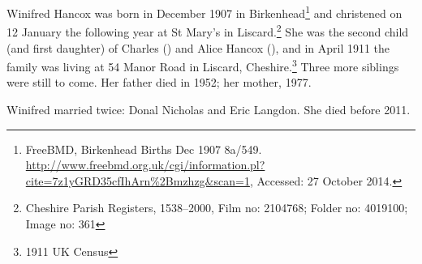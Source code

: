 
Winifred Hancox was born in December 1907 in Birkenhead\footnote{FreeBMD, Birkenhead Births Dec 1907 8a/549. \url{http://www.freebmd.org.uk/cgi/information.pl?cite=7z1yGRD35cfIhArn\%2Bmzhzg&scan=1}, Accessed: 27 October 2014.} and christened on 12 January the following year at St Mary's in Liscard.\footnote{Cheshire Parish Registers, 1538--2000, Film no: 2104768; Folder no: 4019100; Image no: 361} She was the second child (and first daughter) of Charles () and Alice Hancox (), and in April 1911 the family was living at 54 Manor Road in Liscard, Cheshire.\footnote{1911 UK Census} Three more siblings were still to come. Her father died in 1952; her mother, 1977.

Winifred married twice: Donal Nicholas and Eric Langdon. She died before 2011.
